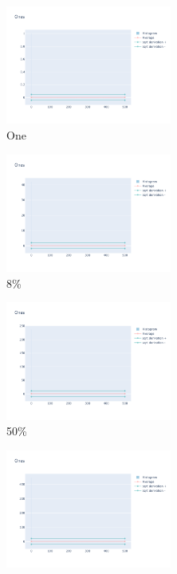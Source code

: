 \documentclass[12pt, fleqn]{report}                             %
\theoremstyle{break}                                            %
\begin{document}
      \begin{figure}[ht!]
        \centering
        \begin{subfigure}[b]{0.4\linewidth}
          \includegraphics[width=0.6\textwidth]{Images/0/dia-a.png}
          \caption{One}
        \end{subfigure}
        \begin{subfigure}[b]{0.4\linewidth}
          \includegraphics[width=0.6\textwidth]{Images/0/dia-b.png}
          \caption{8\%}
        \end{subfigure}
        \begin{subfigure}[b]{0.4\linewidth}
          \includegraphics[width=0.6\textwidth]{Images/0/dia-c.png}
          \caption{50\%}
        \end{subfigure}
        \begin{subfigure}[b]{0.4\linewidth}
          \includegraphics[width=0.6\textwidth]{Images/0/dia-d.png}

\end{subfigure}
\end{figure}
\end{document}
